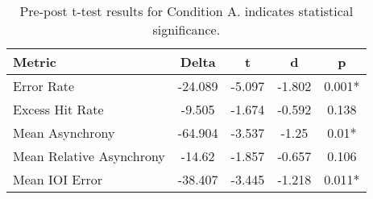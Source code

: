
    \begin{table}[H]
    \centering
    \begin{small}
    \begin{tabular}{lcccc}
\toprule
Metric & Delta & t & d & p \\
\midrule
Error Rate & -24.089 & -5.097 & -1.802 & 0.001* \\
Excess Hit Rate & -9.505 & -1.674 & -0.592 & 0.138 \\
Mean Asynchrony & -64.904 & -3.537 & -1.25 & 0.01* \\
Mean Relative Asynchrony & -14.62 & -1.857 & -0.657 & 0.106 \\
Mean IOI Error & -38.407 & -3.445 & -1.218 & 0.011* \\
\bottomrule
\end{tabular}

    \end{small}
    \caption[Pre-post t-test results for Condition A]{Pre-post t-test results for Condition A. \newline * indicates statistical significance.}
    \label{tab:PrePost_A}
    \end{table}